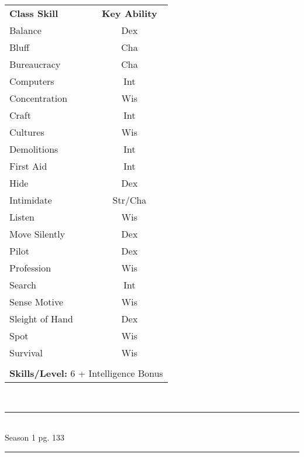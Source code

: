 \setlength{\intextsep}{-2cm}

\begin{table}[htb]
\raggedright
\begin{tabular}{l c}
\textbf{Class Skill} & \textbf{Key Ability}\\

Balance & Dex\\
Bluff & Cha\\
Bureaucracy & Cha\\
Computers & Int\\
Concentration & Wis\\
Craft & Int\\
Cultures & Wis\\
Demolitions & Int\\
First Aid & Int\\
Hide & Dex\\
Intimidate & Str/Cha\\
Listen & Wis\\
Move Silently & Dex\\
Pilot & Dex\\
Profession & Wis\\
Search & Int\\
Sense Motive & Wis\\
Sleight of Hand & Dex\\
Spot & Wis\\
Survival & Wis\\


\multicolumn{2}{l}{\cellcolor{white}}\\
\multicolumn{2}{l}{\cellcolor{white}\textbf{Skills/Level:} 6 + Intelligence Bonus}\\
\end{tabular}
\end{table}

\setlength{\intextsep}{14.0pt plus 4.0pt minus 4.0pt}

\vspace*{2cm}

\vspace*{\fill}

\begin{center}
\textsc{\Large}\\[0.25cm]
\rule{\linewidth}{0.5mm}\\[0.6cm]
\fontsize{30}{30} \selectfont Season 1 pg. 133\\
\rule{\linewidth}{0.5mm}\\[0.6cm]
\vfill
\end{center}

\pagebreak



